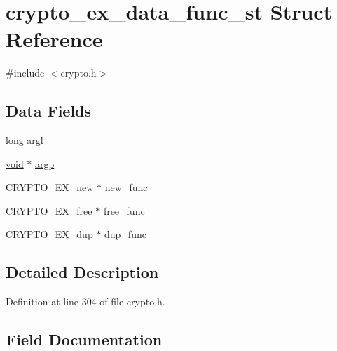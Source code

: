 \hypertarget{structcrypto__ex__data__func__st}{}\section{crypto\+\_\+ex\+\_\+data\+\_\+func\+\_\+st Struct Reference}
\label{structcrypto__ex__data__func__st}


{\ttfamily \#include $<$crypto.\+h$>$}

\subsection*{Data Fields}
\begin{DoxyCompactItemize}
\item 
long \hyperlink{structcrypto__ex__data__func__st_acda556f584eb602930100492bfdfdb21}{argl}
\item 
\hyperlink{hw__4758__cca_8h_afad4d591c7931ff6dc5bf69c76c96aa0}{void} $\ast$ \hyperlink{structcrypto__ex__data__func__st_a6a694c02585dd6b120dbede16204ca29}{argp}
\item 
\hyperlink{include_2openssl_2ossl__typ_8h_a524acd717ae812f604e3027f8255d0ba}{C\+R\+Y\+P\+T\+O\+\_\+\+E\+X\+\_\+new} $\ast$ \hyperlink{structcrypto__ex__data__func__st_a382cb2e6f556306a0f98d15f46593d36}{new\+\_\+func}
\item 
\hyperlink{include_2openssl_2ossl__typ_8h_a723f84d260fce598230a3cdd45885246}{C\+R\+Y\+P\+T\+O\+\_\+\+E\+X\+\_\+free} $\ast$ \hyperlink{structcrypto__ex__data__func__st_acf30973d0269f403cb184e4692cd7315}{free\+\_\+func}
\item 
\hyperlink{include_2openssl_2ossl__typ_8h_a1235777e2310295c33f29a5f06e40682}{C\+R\+Y\+P\+T\+O\+\_\+\+E\+X\+\_\+dup} $\ast$ \hyperlink{structcrypto__ex__data__func__st_a430779382e5b3a9d7c4e9f6f6bb76bf9}{dup\+\_\+func}
\end{DoxyCompactItemize}


\subsection{Detailed Description}


Definition at line 304 of file crypto.\+h.



\subsection{Field Documentation}
